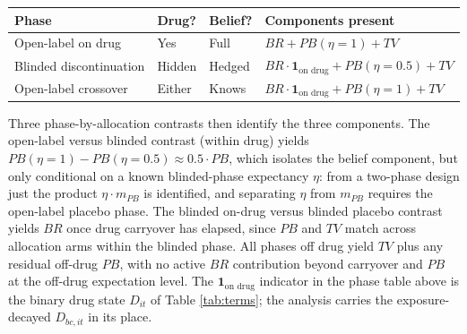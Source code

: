 \documentclass[
  11pt,
]{article}
\newcounter{none} %
\begin{document}
{\def\LTcaptype{none} %
\begin{longtable}[]{@{}
  >{\raggedright\arraybackslash}p{}
  >{\raggedright\arraybackslash}p{}
  >{\raggedright\arraybackslash}p{}
  >{\raggedright\arraybackslash}p{}@{}}
\toprule\noalign{}
\begin{minipage}[b]{\linewidth}\raggedright
Phase
\end{minipage} & \begin{minipage}[b]{\linewidth}\raggedright
Drug?
\end{minipage} & \begin{minipage}[b]{\linewidth}\raggedright
Belief?
\end{minipage} & \begin{minipage}[b]{\linewidth}\raggedright
Components present
\end{minipage} \\
\midrule\noalign{}
\endhead
\bottomrule\noalign{}
\endlastfoot
Open-label on drug & Yes & Full & \(BR + PB(\eta = 1) + TV\) \\
Blinded discontinuation & Hidden & Hedged & \(BR \cdot \mathbf{1}_{\text{on drug}} + PB(\eta = 0.5) + TV\) \\
Open-label crossover & Either & Knows & \(BR \cdot \mathbf{1}_{\text{on drug}} + PB(\eta = 1) + TV\) \\
\end{longtable}
}

Three phase-by-allocation contrasts then identify the three components. The
open-label versus blinded contrast (within drug) yields \(PB(\eta = 1) -
PB(\eta = 0.5) \approx 0.5 \cdot PB\), which isolates the belief component, but
only conditional on a known blinded-phase expectancy \(\eta\): from a two-phase
design just the product \(\eta \cdot m_{PB}\) is identified, and separating
\(\eta\) from \(m_{PB}\) requires the open-label placebo phase. The blinded
on-drug versus blinded placebo contrast yields \(BR\) once drug carryover has
elapsed, since \(PB\) and \(TV\) match across allocation arms within the blinded
phase. All phases off drug yield \(TV\) plus any residual off-drug \(PB\), with no
active \(BR\) contribution beyond carryover and \(PB\) at the off-drug expectation
level. The \(\mathbf{1}_{\text{on drug}}\) indicator in the phase table above is
the binary drug state \(D_{it}\) of Table \ref{tab:terms}; the analysis
carries the exposure-decayed \(D_{bc,it}\) in its place.
\end{document}
